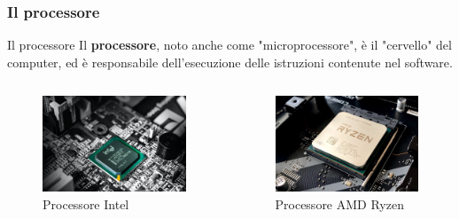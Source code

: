\subsubsection[Il processore]{Il processore}
\begin{frame}
	
	\begin{block}{Il processore}
		Il \textbf{processore}, noto anche come "microprocessore", è il "cervello" del computer, ed è responsabile dell'esecuzione delle istruzioni contenute nel software.
	\end{block}

	\begin{columns}			
		\begin{figure}[!htbp] 
			\centering
			\includegraphics[width=1.0\linewidth]{images/3_architetture/intel.jpg}
			\caption{Processore Intel}
			\label{fig:architectures_intel}
		\end{figure}
					
		\begin{figure}[!htbp] 
			\centering
			\includegraphics[width=1.0\linewidth]{images/3_architetture/ryzen.jpg}
			\caption{Processore AMD Ryzen}
			\label{fig:architectures_ryzen}
		\end{figure}
		
	\end{columns}
	
\end{frame}



